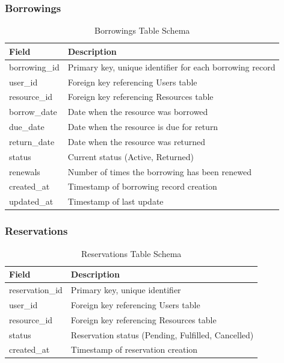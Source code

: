 \documentclass[11pt,a4paper]{article}
\begin{document}
\subsubsection{Borrowings}

\begin{table}[h]
\centering
\begin{tabular}{@{}ll@{}}
\toprule
\textbf{Field} & \textbf{Description} \\
\midrule
borrowing\_id & Primary key, unique identifier for each borrowing record \\
user\_id & Foreign key referencing Users table \\
resource\_id & Foreign key referencing Resources table \\
borrow\_date & Date when the resource was borrowed \\
due\_date & Date when the resource is due for return \\
return\_date & Date when the resource was returned \\
status & Current status (Active, Returned) \\
renewals & Number of times the borrowing has been renewed \\
created\_at & Timestamp of borrowing record creation \\
updated\_at & Timestamp of last update \\
\bottomrule
\end{tabular}
\caption{Borrowings Table Schema}
\end{table}

\subsubsection{Reservations}

\begin{table}[h]
\centering
\begin{tabular}{@{}ll@{}}
\toprule
\textbf{Field} & \textbf{Description} \\
\midrule
reservation\_id & Primary key, unique identifier \\
user\_id & Foreign key referencing Users table \\
resource\_id & Foreign key referencing Resources table \\
status & Reservation status (Pending, Fulfilled, Cancelled) \\
created\_at & Timestamp of reservation creation \\
\bottomrule
\end{tabular}
\caption{Reservations Table Schema}
\end{table}
\end{document}
